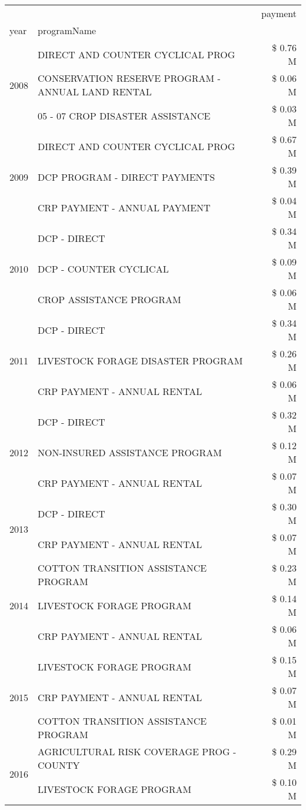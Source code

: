 \begin{tabular}{llr}
\toprule
 &  & payment \\
year & programName &  \\
\midrule
\multirow[t]{3}{*}{2008} & DIRECT AND COUNTER CYCLICAL PROG & \$ 0.76 M \\
 & CONSERVATION RESERVE PROGRAM - ANNUAL LAND RENTAL & \$ 0.06 M \\
 & 05 - 07 CROP DISASTER ASSISTANCE & \$ 0.03 M \\
\cline{1-3}
\multirow[t]{3}{*}{2009} & DIRECT AND COUNTER CYCLICAL PROG & \$ 0.67 M \\
 & DCP PROGRAM - DIRECT PAYMENTS & \$ 0.39 M \\
 & CRP PAYMENT - ANNUAL PAYMENT & \$ 0.04 M \\
\cline{1-3}
\multirow[t]{3}{*}{2010} & DCP - DIRECT & \$ 0.34 M \\
 & DCP - COUNTER CYCLICAL & \$ 0.09 M \\
 & CROP ASSISTANCE PROGRAM & \$ 0.06 M \\
\cline{1-3}
\multirow[t]{3}{*}{2011} & DCP - DIRECT & \$ 0.34 M \\
 & LIVESTOCK FORAGE DISASTER PROGRAM & \$ 0.26 M \\
 & CRP PAYMENT - ANNUAL RENTAL & \$ 0.06 M \\
\cline{1-3}
\multirow[t]{3}{*}{2012} & DCP - DIRECT & \$ 0.32 M \\
 & NON-INSURED ASSISTANCE PROGRAM & \$ 0.12 M \\
 & CRP PAYMENT - ANNUAL RENTAL & \$ 0.07 M \\
\cline{1-3}
\multirow[t]{2}{*}{2013} & DCP - DIRECT & \$ 0.30 M \\
 & CRP PAYMENT - ANNUAL RENTAL & \$ 0.07 M \\
\cline{1-3}
\multirow[t]{3}{*}{2014} & COTTON TRANSITION ASSISTANCE PROGRAM & \$ 0.23 M \\
 & LIVESTOCK FORAGE PROGRAM & \$ 0.14 M \\
 & CRP PAYMENT - ANNUAL RENTAL & \$ 0.06 M \\
\cline{1-3}
\multirow[t]{3}{*}{2015} & LIVESTOCK FORAGE PROGRAM & \$ 0.15 M \\
 & CRP PAYMENT - ANNUAL RENTAL & \$ 0.07 M \\
 & COTTON TRANSITION ASSISTANCE PROGRAM & \$ 0.01 M \\
\cline{1-3}
\multirow[t]{3}{*}{2016} & AGRICULTURAL RISK COVERAGE PROG - COUNTY & \$ 0.29 M \\
 & LIVESTOCK FORAGE PROGRAM & \$ 0.10 M \\

\end{tabular}
